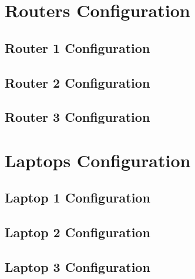 \appendix

\begingroup

\chapter{Routers Configuration}
\label{app:routers}

\section{Router 1 Configuration}
\label{app:sec:router1}

\section{Router 2 Configuration}
\label{app:sec:router2}

\section{Router 3 Configuration}
\label{app:sec:router3}



\chapter{Laptops Configuration}
\label{app:laptops}

\section{Laptop 1 Configuration}
\label{app:sec:laptop1}

\section{Laptop 2 Configuration}
\label{app:sec:laptop2}

\section{Laptop 3 Configuration}
\label{app:sec:laptop3}

\endgroup
